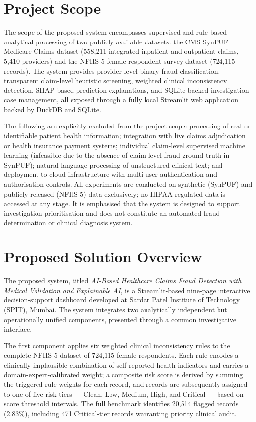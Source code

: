 \section{Project Scope}
\label{sec:scope}

The scope of the proposed system encompasses supervised and rule-based analytical processing of two publicly available datasets: the CMS SynPUF Medicare Claims dataset (558,211 integrated inpatient and outpatient claims, 5,410 providers) and the NFHS-5 female-respondent survey dataset (724,115 records). The system provides provider-level binary fraud classification, transparent claim-level heuristic screening, weighted clinical inconsistency detection, SHAP-based prediction explanations, and SQLite-backed investigation case management, all exposed through a fully local Streamlit web application backed by DuckDB and SQLite.

The following are explicitly excluded from the project scope: processing of real or identifiable patient health information; integration with live claims adjudication or health insurance payment systems; individual claim-level supervised machine learning (infeasible due to the absence of claim-level fraud ground truth in SynPUF); natural language processing of unstructured clinical text; and deployment to cloud infrastructure with multi-user authentication and authorisation controls. All experiments are conducted on synthetic (SynPUF) and publicly released (NFHS-5) data exclusively; no HIPAA-regulated data is accessed at any stage. It is emphasised that the system is designed to support investigation prioritisation and does not constitute an automated fraud determination or clinical diagnosis system.

\section{Proposed Solution Overview}
\label{sec:solution}

The proposed system, titled \textit{AI-Based Healthcare Claims Fraud Detection with Medical Validation and Explainable AI}, is a Streamlit-based nine-page interactive decision-support dashboard developed at Sardar Patel Institute of Technology (SPIT), Mumbai. The system integrates two analytically independent but operationally unified components, presented through a common investigative interface.

The first component applies six weighted clinical inconsistency rules to the complete NFHS-5 dataset of 724,115 female respondents. Each rule encodes a clinically implausible combination of self-reported health indicators and carries a domain-expert-calibrated weight; a composite risk score is derived by summing the triggered rule weights for each record, and records are subsequently assigned to one of five risk tiers --- Clean, Low, Medium, High, and Critical --- based on score threshold intervals. The full benchmark identifies 20,514 flagged records (2.83\%), including 471 Critical-tier records warranting priority clinical audit.

